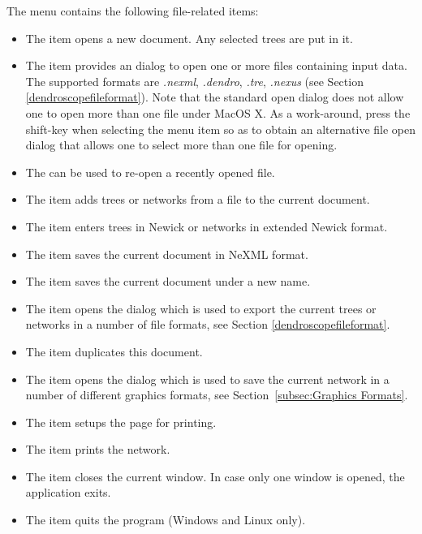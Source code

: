 \documentclass[11pt]{article}
\begin{document}
The  menu contains the following file-related items:
\begin{itemize}
\item The  item opens a new document. Any selected trees are put in it.
\item The  item provides an  dialog
to open one or more files containing input data. The supported formats are 
\textit{.nexml}, \textit{.dendro}, \textit{.tre}, \textit{.nexus} (see Section \ref{dendroscopefileformat}).
Note that the standard open dialog does not allow one to open more than one file under MacOS X.
As a work-around, press the shift-key when selecting the    menu item so as to obtain
an alternative file open dialog that allows one to select more than one file for opening.
\item The  can be used to re-open a recently opened file.
\item The  item adds trees or networks from a file to the current document.
\item The  item enters trees in Newick or networks in extended Newick format.
\item The  item saves the current document in NeXML format.
\item The  item saves the current document under a new name.
\item The  item 
opens the  dialog
which is used to export the current trees or networks in a number of file 
formats, see  Section \ref{dendroscopefileformat}. 
\item The  item duplicates this document.
\item The  item  opens the  dialog
which is used to save the current network in a number of different graphics
formats, see Section~\ref{subsec:Graphics Formats}.
\item The  item setups the page for printing.
\item The  item prints the network.
\item The  item closes the current window. In case only one window is opened, the application exits.
\item The  item quits the program (Windows and Linux only).
\end{itemize}   
\end{document}

